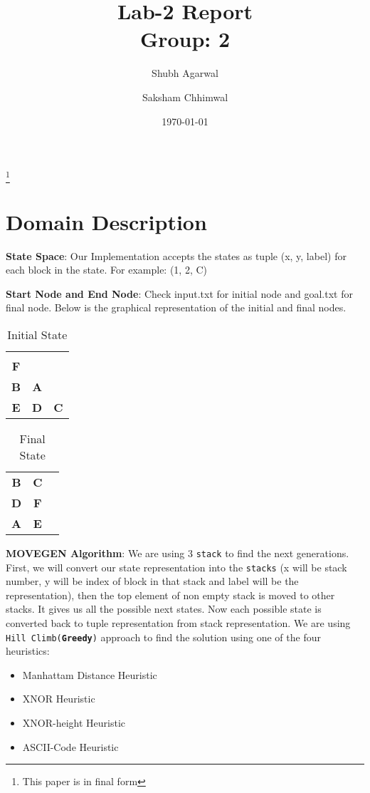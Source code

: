 \documentclass[a4paper,10pt,reqno,oneside]{amsart}
\begin{document}
\title[Block World Domain (Greedy Approach)]{Lab-2 Report\\Group: 2}
\author{Shubh Agarwal}
%

\author{Saksham Chhimwal}
%
\thanks{This paper is in final form}
\date{\today}

\maketitle

\section{Domain Description}

\textbf{State Space}: Our Implementation accepts the states as tuple (x, y, label) for each block in the state. 
For example: (1, 2, C)

\textbf{Start Node and End Node}: Check input.txt for initial node and goal.txt for final node. Below 
is the graphical representation of the initial and final nodes.

\begin{table}[h]
    \begin{tabular}{ccc}
    \textbf{}  & \textbf{}  & \textbf{}  \\
    \textbf{F} & \textbf{}  & \textbf{}  \\
    \textbf{B} & \textbf{A} & \textbf{}  \\
    \textbf{E} & \textbf{D} & \textbf{C}
    \end{tabular}
    \caption{Initial State}
\end{table}

\begin{table}[h]
    \begin{tabular}{ccc}
    \textbf{B} & \textbf{C} & \textbf{} \\
    \textbf{D} & \textbf{F} & \textbf{} \\
    \textbf{A} & \textbf{E} & \textbf{}
    \end{tabular}
    \caption{Final State}
\end{table}

\textbf{MOVEGEN Algorithm}: We are using 3 \texttt{stack} to find the next generations. First, we will convert 
our state representation into the \texttt{stacks} (x will be stack number, y  will be index of block in that stack and label will 
be the representation), then the top element of non empty stack is moved to other stacks. It gives us all the possible next states. 
Now each possible state is converted back to tuple representation from stack representation. We are using 
\texttt{Hill Climb(\textbf{Greedy})} approach to find the solution using one of the four heuristics:
\begin{itemize}
    \item Manhattam Distance Heuristic
    \item XNOR Heuristic
    \item XNOR-height Heuristic
    \item ASCII-Code Heuristic
\end{itemize}
\end{document}
